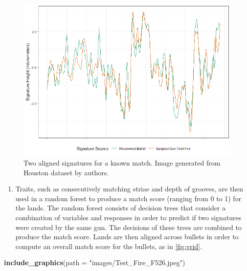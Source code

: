 \documentclass[print]{nuthesis}
\newenvironment{Shaded}{\begin{snugshade}}{\end{snugshade}}
\newcommand{\AttributeTok}[1]{\textcolor[rgb]{0.13,0.29,0.53}{#1}}
\newcommand{\FunctionTok}[1]{\textcolor[rgb]{0.13,0.29,0.53}{\textbf{#1}}}
\newcommand{\NormalTok}[1]{#1}
\newcommand{\StringTok}[1]{\textcolor[rgb]{0.31,0.60,0.02}{#1}}
\providecommand{\tightlist}{%
  \setlength{\itemsep}{0pt}\setlength{\parskip}{0pt}}
\begin{document}
\begin{figure}
\includegraphics[width=\linewidth]{images/F526_Match_Signatures} \caption{Two aligned signatures for a known match. Image generated from Houston dataset by authors.}\label{fig:signature}
\end{figure}

\begin{enumerate}
\def\labelenumi{\arabic{enumi}.}
\setcounter{enumi}{2}
\tightlist
\item
  Traits, such as consecutively matching striae and depth of grooves, are then used in a random forest to produce a match score (ranging from 0 to 1) for the lands.
  The random forest consists of decision trees that consider a combination of variables and responses in order to predict if two signatures were created by the same gun.
  The decisions of these trees are combined to produce the match score.
  Lands are then aligned across bullets in order to compute an overall match score for the bullets, as in \ref{fig:grid}.
\end{enumerate}

\begin{Shaded}
\begin{Highlighting}[]
\FunctionTok{include\_graphics}\NormalTok{(}\AttributeTok{path =} \StringTok{"images/Test\_Fire\_F526.jpeg"}\NormalTok{)}
\end{Highlighting}
\end{Shaded}
\end{document}
